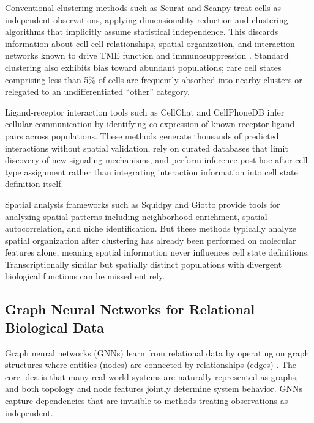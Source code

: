 \documentclass{article}
\begin{document}
Conventional clustering methods such as Seurat \citep{hao2021integrated} and Scanpy \citep{wolf2018scanpy} treat cells as independent observations, applying dimensionality reduction and clustering algorithms that implicitly assume statistical independence. This discards information about cell-cell relationships, spatial organization, and interaction networks known to drive TME function and immunosuppression \citep{palla2022squidpy}. Standard clustering also exhibits bias toward abundant populations; rare cell states comprising less than 5\% of cells are frequently absorbed into nearby clusters or relegated to an undifferentiated ``other'' category.

Ligand-receptor interaction tools such as CellChat \citep{jin2021inference} and CellPhoneDB \citep{efremova2020cellphonedb} infer cellular communication by identifying co-expression of known receptor-ligand pairs across populations. These methods generate thousands of predicted interactions without spatial validation, rely on curated databases that limit discovery of new signaling mechanisms, and perform inference post-hoc after cell type assignment rather than integrating interaction information into cell state definition itself.

Spatial analysis frameworks such as Squidpy \citep{palla2022squidpy} and Giotto \citep{dries2021giotto} provide tools for analyzing spatial patterns including neighborhood enrichment, spatial autocorrelation, and niche identification. But these methods typically analyze spatial organization after clustering has already been performed on molecular features alone, meaning spatial information never influences cell state definitions. Transcriptionally similar but spatially distinct populations with divergent biological functions can be missed entirely.

\subsection{Graph Neural Networks for Relational Biological Data}

Graph neural networks (GNNs) learn from relational data by operating on graph structures where entities (nodes) are connected by relationships (edges) \citep{wu2020comprehensive}. The core idea is that many real-world systems are naturally represented as graphs, and both topology and node features jointly determine system behavior. GNNs capture dependencies that are invisible to methods treating observations as independent.
\end{document}
